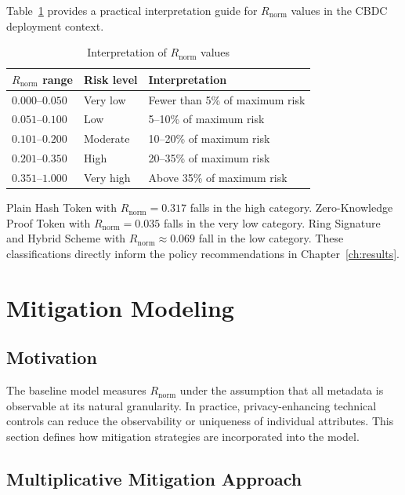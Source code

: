Table~\ref{tab:r_norm_interp} provides a practical
interpretation guide for $R_{\mathrm{norm}}$ values
in the CBDC deployment context.

\begin{table}[H]
\centering
\caption{Interpretation of $R_{\mathrm{norm}}$ values}
\label{tab:r_norm_interp}
\begin{tabular}{lll}
\toprule
\textbf{$R_{\mathrm{norm}}$ range} &
\textbf{Risk level} &
\textbf{Interpretation} \\
\midrule
$0.000$--$0.050$ & Very low  &
Fewer than 5\% of maximum risk \\
$0.051$--$0.100$ & Low       &
5--10\% of maximum risk \\
$0.101$--$0.200$ & Moderate  &
10--20\% of maximum risk \\
$0.201$--$0.350$ & High      &
20--35\% of maximum risk \\
$0.351$--$1.000$ & Very high &
Above 35\% of maximum risk \\
\bottomrule
\end{tabular}
\end{table}

Plain Hash Token with $R_{\mathrm{norm}} = 0.317$ falls
in the high category. Zero-Knowledge Proof Token with
$R_{\mathrm{norm}} = 0.035$ falls in the very low
category. Ring Signature and Hybrid Scheme with
$R_{\mathrm{norm}} \approx 0.069$ fall in the low
category. These classifications directly inform the
policy recommendations in Chapter~\ref{ch:results}.

\section{Mitigation Modeling}
\label{sec:mitigation}

\subsection{Motivation}

The baseline model measures $R_{\mathrm{norm}}$ under
the assumption that all metadata is observable at its
natural granularity. In practice, privacy-enhancing
technical controls can reduce the observability or
uniqueness of individual attributes. This section defines
how mitigation strategies are incorporated into the model.

\subsection{Multiplicative Mitigation Approach}

